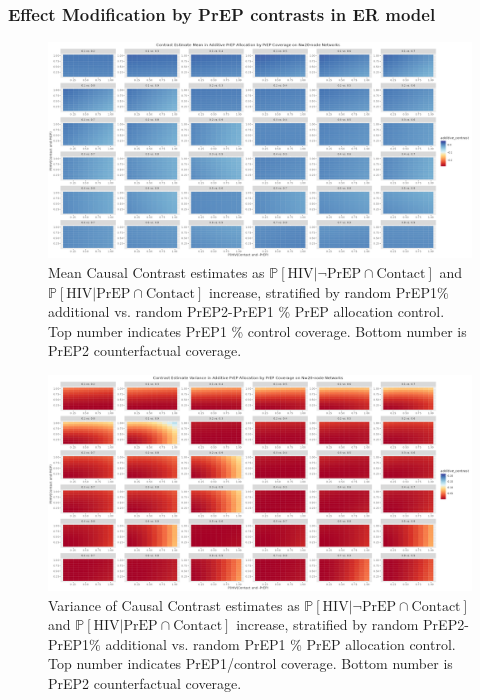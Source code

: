 \documentclass{article}
\theoremstyle{definition}
\begin{document}
\subsubsection{Effect Modification by PrEP contrasts in ER model}
\begin{figure}[H]
    \centering
    \includegraphics[width=\linewidth]{Corrected Figures/PrEP Additive Mean Plots.png}
    \caption{Mean Causal Contrast estimates as $\mathbb{P}\left[\text{HIV} \vert \neg \text{PrEP} \cap \text{Contact}\right]$ and $\mathbb{P}\left[\text{HIV} \vert \text{PrEP} \cap \text{Contact}\right]$ increase, stratified by random PrEP1\% additional vs. random PrEP2-PrEP1 \% PrEP allocation control. Top number indicates PrEP1 \% control coverage. Bottom number is PrEP2 counterfactual coverage. }
    \label{fig:Figure S4.11}
\end{figure}
\begin{figure}[H]
    \centering
    \includegraphics[width=\linewidth]{Corrected Figures/PrEP Additive Variance Plots.png}
    \caption{Variance of Causal Contrast estimates as $\mathbb{P}\left[\text{HIV} \vert \neg \text{PrEP} \cap \text{Contact}\right]$ and $\mathbb{P}\left[\text{HIV} \vert \text{PrEP} \cap \text{Contact}\right]$ increase, stratified by random PrEP2-PrEP1\% additional vs. random PrEP1 \% PrEP allocation control. Top number indicates PrEP1/control coverage. Bottom number is PrEP2 counterfactual coverage.}
    \label{fig:Figure S4.12}
\end{figure}
\end{document}
